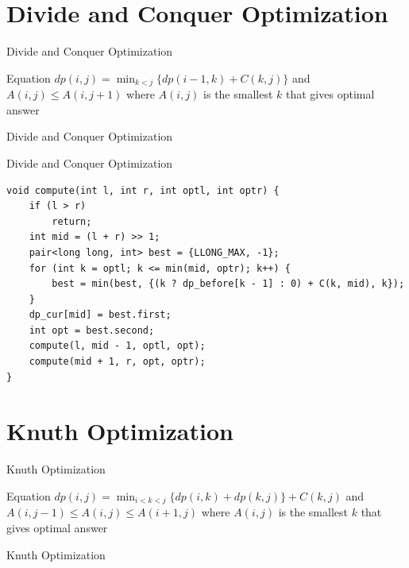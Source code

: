 \documentclass[aspectratio=169,xcolor=dvipsnames]{beamer}
\begin{document}

\section{Divide and Conquer Optimization}
\begin{frame}[plain]{Divide and Conquer Optimization}
\begin{block}{Equation}
        $dp(i, j) =  \displaystyle\min_{k < j}\{dp(i-1, k)+ C(k, j)\}$ and $A(i, j) \leq A(i, j+1)$ where $A(i, j)$ is the smallest $k$ that gives optimal answer
\end{block}
\end{frame}

\begin{frame}[plain]{Divide and Conquer Optimization}

\end{frame}

\begin{frame}{Divide and Conquer Optimization}
\begin{examples}
\begin{verbatim}
void compute(int l, int r, int optl, int optr) {
    if (l > r)
        return;
    int mid = (l + r) >> 1;
    pair<long long, int> best = {LLONG_MAX, -1};
    for (int k = optl; k <= min(mid, optr); k++) {
        best = min(best, {(k ? dp_before[k - 1] : 0) + C(k, mid), k});
    }
    dp_cur[mid] = best.first;
    int opt = best.second;
    compute(l, mid - 1, optl, opt);
    compute(mid + 1, r, opt, optr);
}
\end{verbatim}
\end{examples}
\end{frame}


\section{Knuth Optimization}
\begin{frame}[plain]{Knuth Optimization}
\begin{block}{Equation}
        $dp(i, j) =  \displaystyle\min_{i < k < j}\{dp(i, k)+dp(k, j)\} +  C(k, j)$ and $A(i, j-1) \leq A(i, j) \leq A(i+1, j)$ where $A(i, j)$ is the smallest $k$ that gives optimal answer
\end{block}
\end{frame}

\begin{frame}[plain]{Knuth Optimization}

\end{frame}
\end{document}
